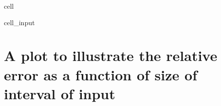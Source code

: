 \documentclass[letterpaper,10pt,english]{jupyterBook}
\begin{document}
\begin{sphinxuseclass}{cell}
\begin{sphinxVerbatimInput}
\begin{sphinxuseclass}{cell_input}
\begin{sphinxVerbatim}[commandchars=\\\{\}]
           
\end{sphinxVerbatim}

\end{sphinxuseclass}\end{sphinxVerbatimInput}

\end{sphinxuseclass}

\section{A plot to illustrate the relative error as a function of size of interval of input}
\label{\detokenize{notebooks/Chapter4/linear-interpolation-nternal-energy:a-plot-to-illustrate-the-relative-error-as-a-function-of-size-of-interval-of-input}}
\end{document}
